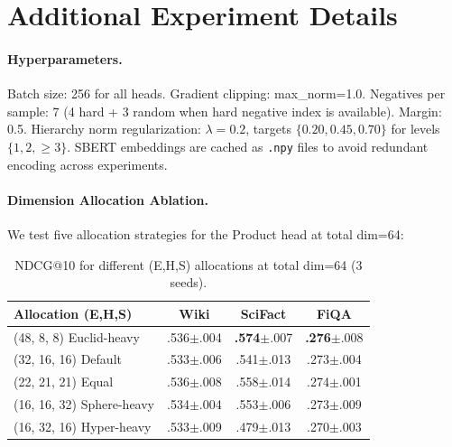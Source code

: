 \documentclass{article}
\begin{document}
\appendix
\section{Additional Experiment Details}

\paragraph{Hyperparameters.} Batch size: 256 for all heads. Gradient clipping: max\_norm=1.0. Negatives per sample: 7 (4 hard + 3 random when hard negative index is available). Margin: 0.5. Hierarchy norm regularization: $\lambda=0.2$, targets $\{0.20, 0.45, 0.70\}$ for levels $\{1, 2, \geq3\}$. SBERT embeddings are cached as \texttt{.npy} files to avoid redundant encoding across experiments.

\paragraph{Dimension Allocation Ablation.} We test five allocation strategies for the Product head at total dim=64:

\begin{table}[h]
\centering
\small
\caption{NDCG@10 for different (E,H,S) allocations at total dim=64 (3 seeds).}
\vspace{0.2cm}
\begin{tabular}{@{}lccc@{}}
\toprule
Allocation (E,H,S) & Wiki & SciFact & FiQA \\
\midrule
(48, 8, 8)  Euclid-heavy   & .536{\scriptsize$\pm$.004} & \textbf{.574}{\scriptsize$\pm$.007} & \textbf{.276}{\scriptsize$\pm$.008} \\
(32, 16, 16) Default       & .533{\scriptsize$\pm$.006} & .541{\scriptsize$\pm$.013} & .273{\scriptsize$\pm$.004} \\
(22, 21, 21) Equal         & .536{\scriptsize$\pm$.008} & .558{\scriptsize$\pm$.014} & .274{\scriptsize$\pm$.001} \\
(16, 16, 32) Sphere-heavy  & .534{\scriptsize$\pm$.004} & .553{\scriptsize$\pm$.006} & .273{\scriptsize$\pm$.009} \\
(16, 32, 16) Hyper-heavy   & .533{\scriptsize$\pm$.009} & .479{\scriptsize$\pm$.013} & .270{\scriptsize$\pm$.003} \\
\bottomrule
\end{tabular}
\end{table}
\end{document}
